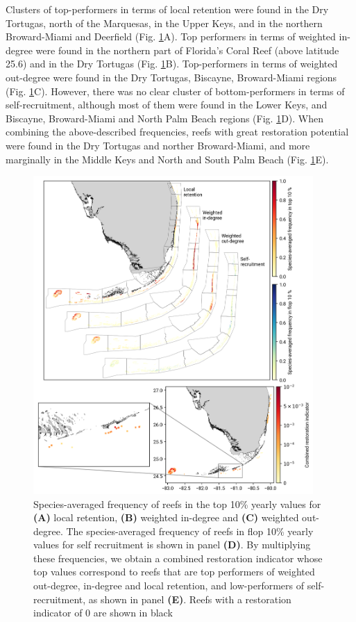 \documentclass[preprint,12pt,authoryear]{elsarticle}
\begin{document}
Clusters of top-performers in terms of local retention were found in the Dry Tortugas, north of the Marquesas, in the Upper Keys, and in the northern Broward-Miami and Deerfield  (Fig. \ref{fig:top10}A). Top performers in terms of weighted in-degree were found in the northern part of Florida's Coral Reef (above latitude 25.6) and in the Dry Tortugas (Fig. \ref{fig:top10}B). Top-performers in terms of weighted out-degree were found in the Dry Tortugas, Biscayne, Broward-Miami regions (Fig. \ref{fig:top10}C). However, there was no clear cluster of bottom-performers in terms of self-recruitment, although most of them were found in the Lower Keys, and Biscayne, Broward-Miami and North Palm Beach regions (Fig. \ref{fig:top10}D). When combining the above-described frequencies, reefs with great restoration potential were found in the Dry Tortugas and norther Broward-Miami, and more marginally in the Middle Keys and North and South Palm Beach (Fig. \ref{fig:top10}E).

\begin{figure}
   \centering
   \includegraphics[width=0.95\textwidth]{figures/fig_top10.png}
   \caption{Species-averaged frequency of reefs in the top 10\% yearly values for \textbf{(A)} local retention, \textbf{(B)} weighted in-degree and \textbf{(C)} weighted out-degree. The species-averaged frequency of reefs in flop 10\% yearly values for self recruitment is shown in panel \textbf{(D)}. By multiplying these frequencies, we obtain a combined restoration indicator whose top values correspond to reefs that are top performers of weighted out-degree, in-degree and local retention, and low-performers of self-recruitment, as shown in panel \textbf{(E)}. Reefs with a restoration indicator of 0 are shown in black}\label{fig:top10}
\end{figure}
\end{document}
